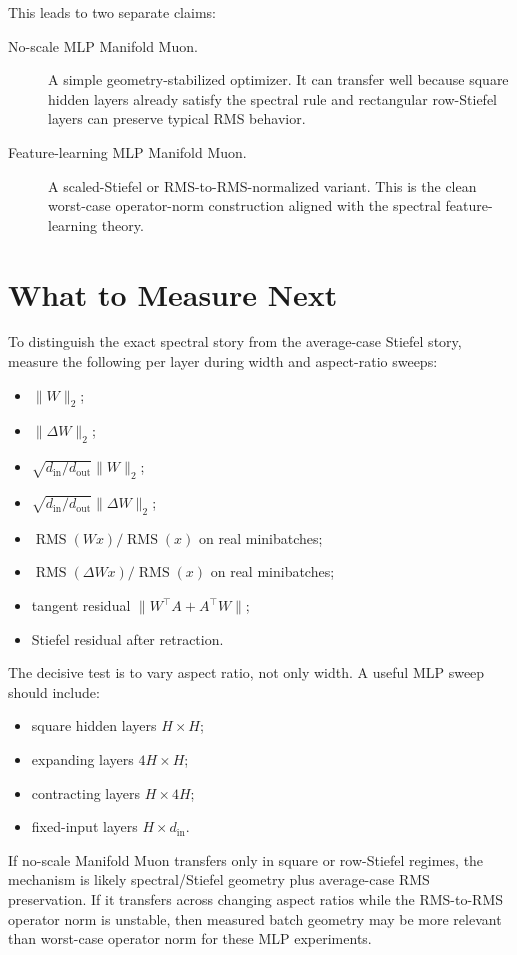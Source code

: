 \documentclass[12pt]{article}
\newcommand{\rms}{\operatorname{RMS}}
\newcommand{\fanin}{d_{\mathrm{in}}}
\newcommand{\fanout}{d_{\mathrm{out}}}
\begin{document}
This leads to two separate claims:
\begin{description}
    \item[No-scale MLP Manifold Muon.]
    A simple geometry-stabilized optimizer. It can transfer well because square
    hidden layers already satisfy the spectral rule and rectangular
    row-Stiefel layers can preserve typical RMS behavior.

    \item[Feature-learning MLP Manifold Muon.]
    A scaled-Stiefel or RMS-to-RMS-normalized variant. This is the clean
    worst-case operator-norm construction aligned with the spectral
    feature-learning theory.
\end{description}

\section{What to Measure Next}

To distinguish the exact spectral story from the average-case Stiefel story,
measure the following per layer during width and aspect-ratio sweeps:
\begin{itemize}
    \item $\|W\|_2$;
    \item $\|\Delta W\|_2$;
    \item $\sqrt{\fanin/\fanout}\|W\|_2$;
    \item $\sqrt{\fanin/\fanout}\|\Delta W\|_2$;
    \item $\rms(Wx) / \rms(x)$ on real minibatches;
    \item $\rms(\Delta W x) / \rms(x)$ on real minibatches;
    \item tangent residual $\|W^\top A + A^\top W\|$;
    \item Stiefel residual after retraction.
\end{itemize}

The decisive test is to vary aspect ratio, not only width. A useful MLP sweep
should include:
\begin{itemize}
    \item square hidden layers $H \times H$;
    \item expanding layers $4H \times H$;
    \item contracting layers $H \times 4H$;
    \item fixed-input layers $H \times d_{\mathrm{in}}$.
\end{itemize}

If no-scale Manifold Muon transfers only in square or row-Stiefel regimes, the
mechanism is likely spectral/Stiefel geometry plus average-case RMS
preservation. If it transfers across changing aspect ratios while the
RMS-to-RMS operator norm is unstable, then measured batch geometry may be more
relevant than worst-case operator norm for these MLP experiments.
\end{document}
